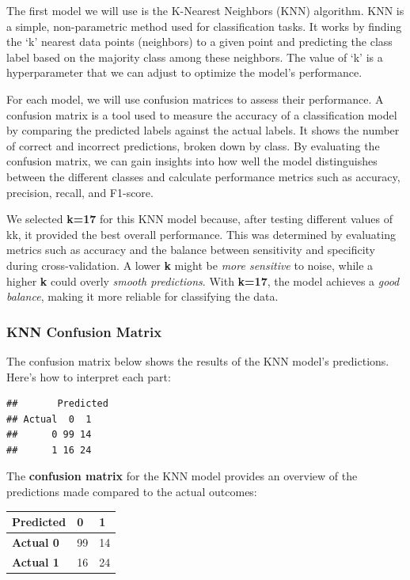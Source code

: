 \documentclass[
]{article}
\begin{document}
The first model we will use is the K-Nearest Neighbors (KNN) algorithm.
KNN is a simple, non-parametric method used for classification tasks. It
works by finding the `k' nearest data points (neighbors) to a given
point and predicting the class label based on the majority class among
these neighbors. The value of `k' is a hyperparameter that we can adjust
to optimize the model's performance.

For each model, we will use confusion matrices to assess their
performance. A confusion matrix is a tool used to measure the accuracy
of a classification model by comparing the predicted labels against the
actual labels. It shows the number of correct and incorrect predictions,
broken down by class. By evaluating the confusion matrix, we can gain
insights into how well the model distinguishes between the different
classes and calculate performance metrics such as accuracy, precision,
recall, and F1-score.

We selected \textbf{k=17} for this KNN model because, after testing
different values of kk, it provided the best overall performance. This
was determined by evaluating metrics such as accuracy and the balance
between sensitivity and specificity during cross-validation. A lower
\textbf{k} might be \emph{more sensitive} to noise, while a higher
\textbf{k} could overly \emph{smooth predictions}. With \textbf{k=17},
the model achieves a \emph{good balance}, making it more reliable for
classifying the data.

\subsubsection{KNN Confusion Matrix}\label{knn-confusion-matrix}

The confusion matrix below shows the results of the KNN model's
predictions. Here's how to interpret each part:

\begin{verbatim}
##       Predicted
## Actual  0  1
##      0 99 14
##      1 16 24
\end{verbatim}

The \textbf{confusion matrix} for the KNN model provides an overview of
the predictions made compared to the actual outcomes:

\begin{longtable}[]{@{}lll@{}}
\toprule\noalign{}
\textbf{Predicted} & \textbf{0} & \textbf{1} \\
\midrule\noalign{}
\endhead
\bottomrule\noalign{}
\endlastfoot
\textbf{Actual 0} & 99 & 14 \\
\textbf{Actual 1} & 16 & 24 \\
\end{longtable}
\end{document}
